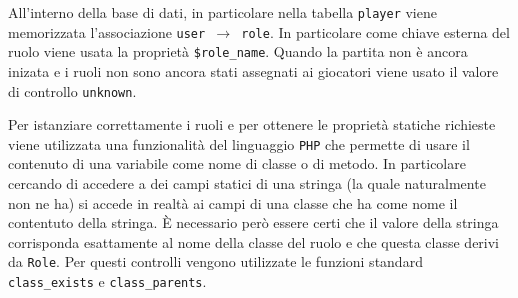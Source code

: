 All'interno della base di dati, in particolare nella tabella \texttt{player} viene memorizzata l'associazione \texttt{user $\rightarrow$ role}. In particolare come chiave esterna del ruolo viene usata la proprietà \texttt{\$role\_name}. Quando la partita non è ancora inizata e i ruoli non sono ancora stati assegnati ai giocatori viene usato il valore di controllo \texttt{unknown}.

Per istanziare correttamente i ruoli e per ottenere le proprietà statiche richieste viene utilizzata una funzionalità del linguaggio \texttt{PHP} che permette di usare il contenuto di una variabile come nome di classe o di metodo. In particolare cercando di accedere a dei campi statici di una stringa (la quale naturalmente non ne ha) si accede in realtà ai campi di una classe che ha come nome il contentuto della stringa. È necessario però essere certi che il valore della stringa corrisponda esattamente al nome della classe del ruolo e che questa classe derivi da \texttt{Role}. Per questi controlli vengono utilizzate le funzioni standard \texttt{class\_exists} e \texttt{class\_parents}.